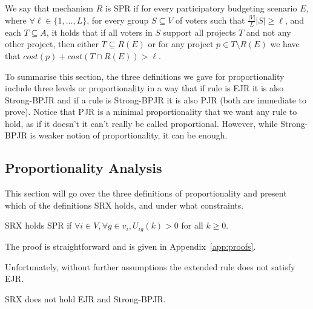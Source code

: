 \documentclass[runningheads]{llncs}
\begin{document}
\begin{definition}  We say that mechanism $R$ is SPR if for every participatory budgeting scenario $E$, where $\forall\ell\in\{1,\ldots,L\}$, for every  group $S\subseteq V$ of voters such that $\frac{|V|}{L}|S|\geq \ell$, and each $T\subseteq A$, it holds that if all voters in $S$ support all projects $T$ and not any other project, then either $T\subseteq R(E)$ or for any project $p\in T\setminus R(E)$ we have that $cost(p) +cost(T\cap R(E))> \ell$.
\end{definition}


To summarise this section, the three definitions we gave for proportionality include three levels or proportionality in a way that if rule is EJR it is also Strong-BPJR and if a rule is Strong-BPJR it is also PJR (both are immediate to prove). Notice that PJR is a minimal proportionality that we want any rule to hold, as if it doesn't it can't really be called proportional. However, while Strong-BPJR is weaker notion of proportionality, it can be enough.

\subsection{Proportionality Analysis}

This section will go over the three definitions of proportionality and present which of the definitions SRX holds, and under what constraints.


\begin{theorem}\label{theorem:spr}
SRX holds SPR if $\forall i\in V, \forall g\in v_i, U_{ig}(k)>0$ for all $k\geq 0$.
\end{theorem}
The proof is straightforward and is given in Appendix~\ref{app:proofs}.



Unfortunately, without further assumptions the extended rule does not satisfy EJR.

\begin{theorem}
SRX does not hold EJR and Strong-BPJR.
\end{theorem}
\end{document}
